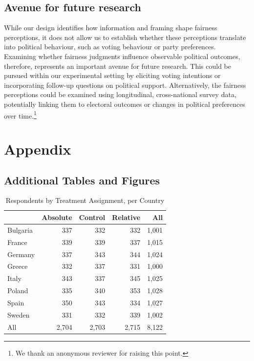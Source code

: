 \documentclass[
  12pt,
  a4paper,
]{article}
\begin{document}
\subsection{Avenue for future research}\label{avenue-for-future-research}

While our design identifies how information and framing shape fairness perceptions, it does not allow us to establish whether these perceptions translate into political behaviour, such as voting behaviour or party preferences. Examining whether fairness judgments influence observable political outcomes, therefore, represents an important avenue for future research. This could be pursued within our experimental setting by eliciting voting intentions or incorporating follow-up questions on political support. Alternatively, the fairness perceptions could be examined using longitudinal, cross-national survey data, potentially linking them to electoral outcomes or changes in political preferences over time.\footnote{
  We thank an anonymous reviewer for raising this point.}

\appendix


\newpage

\setcounter{figure}{1}
\setcounter{table}{1}
\renewcommand\thefigure{\thesection.\arabic{figure}}    
\renewcommand\thetable{\thesection.\arabic{figure}}

\section{Appendix}\label{appendix}

\subsection{Additional Tables and Figures}\label{additional-tables-and-figures}

\begin{table}
\centering
\caption{\label{tab:random-assignment}Respondents by Treatment Assignment, per Country}
\centering
\begin{tabular}[t]{lrrrr}
\toprule
  & Absolute & Control & Relative & All\\
\midrule
Bulgaria & 337 & 332 & 332 & 1,001\\
France & 339 & 339 & 337 & 1,015\\
Germany & 337 & 343 & 344 & 1,024\\
Greece & 332 & 337 & 331 & 1,000\\
Italy & 343 & 337 & 345 & 1,025\\
Poland & 335 & 340 & 353 & 1,028\\
Spain & 350 & 343 & 334 & 1,027\\
Sweden & 331 & 332 & 339 & 1,002\\
\addlinespace
All & 2,704 & 2,703 & 2,715 & 8,122\\
\bottomrule
\end{tabular}
\end{table}
\end{document}
